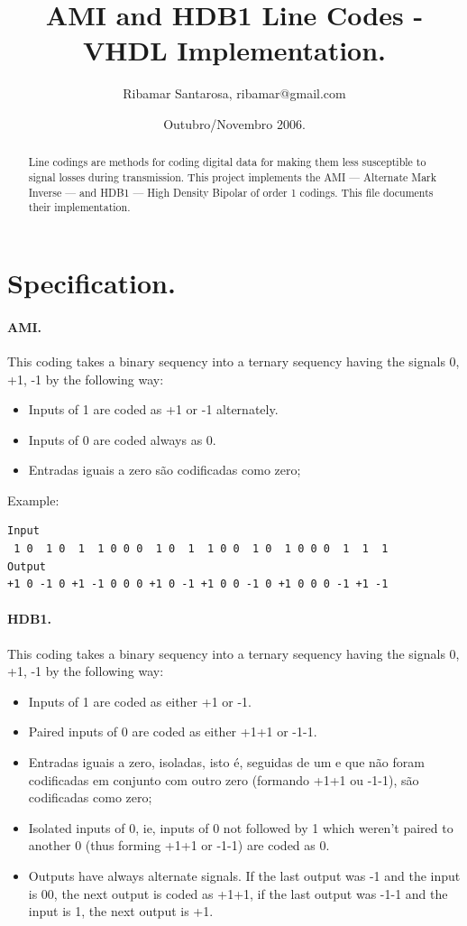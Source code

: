 \documentclass[11pt]{article}
\title{\textbf{AMI and HDB1 Line Codes - VHDL Implementation.}}
\author{Ribamar Santarosa, ribamar@gmail.com}
\date{Outubro/Novembro 2006.}
\begin{document}
\maketitle 


\begin{abstract}
Line codings are methods for coding digital data for making them 
less susceptible to signal losses during transmission. This project 
implements the AMI --- Alternate Mark Inverse --- and HDB1 --- High
Density Bipolar of order 1 codings. This file documents their
implementation. 
\end{abstract}

\section{Specification.}


\paragraph{AMI.} This coding takes a binary sequency into a
ternary sequency having the signals 0, +1, -1 by the following way: 

\begin{itemize}
\item Inputs of 1 are coded as +1 or -1 alternately.
\item Inputs of 0 are coded always as 0. 
\item Entradas iguais a zero são codificadas como zero; 
\end{itemize}

Example: 
\begin{verbatim}
Input 
 1 0  1 0  1  1 0 0 0  1 0  1  1 0 0  1 0  1 0 0 0  1  1  1
Output
+1 0 -1 0 +1 -1 0 0 0 +1 0 -1 +1 0 0 -1 0 +1 0 0 0 -1 +1 -1
\end{verbatim}

\paragraph{HDB1.} This coding takes a binary sequency into a 
ternary sequency having the signals 0, +1, -1 by the following way:

\begin{itemize}
\item Inputs of 1 are coded as either +1 or -1.
\item Paired inputs of 0 are coded as either +1+1 or -1-1.   
\item Entradas iguais a zero, isoladas, isto é, 
seguidas de um e que não foram codificadas em conjunto com outro
zero (formando +1+1 ou -1-1), são codificadas como zero; 
\item Isolated inputs of 0, ie, inputs of 0 not followed by 1 which
weren't paired to another 0 (thus forming +1+1 or -1-1) are coded 
as 0. 
\item Outputs have always alternate signals. If the last output was
-1 and the input is 00, the next output is coded as +1+1, if the
last output was -1-1 and the input is 1, the next output is +1. 
\end{itemize}
\end{document}

